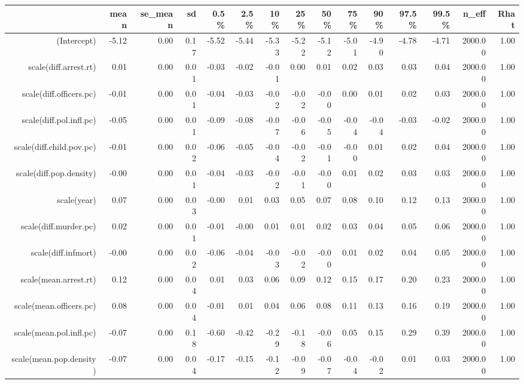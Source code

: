 \begin{table}[ht]
\centering
\begin{tabular}{rrrrrrrrrrrrrrr}
  \hline
 & mean & se\_mean & sd & 0.5\% & 2.5\% & 10\% & 25\% & 50\% & 75\% & 90\% & 97.5\% & 99.5\% & n\_eff & Rhat \\ 
  \hline
(Intercept) & -5.12 & 0.00 & 0.17 & -5.52 & -5.44 & -5.33 & -5.22 & -5.12 & -5.01 & -4.90 & -4.78 & -4.71 & 2000.00 & 1.00 \\ 
  scale(diff.arrest.rt) & 0.01 & 0.00 & 0.01 & -0.03 & -0.02 & -0.01 & 0.00 & 0.01 & 0.02 & 0.03 & 0.03 & 0.04 & 2000.00 & 1.00 \\ 
  scale(diff.officers.pc) & -0.01 & 0.00 & 0.01 & -0.04 & -0.03 & -0.02 & -0.02 & -0.00 & 0.00 & 0.01 & 0.02 & 0.03 & 2000.00 & 1.00 \\ 
  scale(diff.pol.infl.pc) & -0.05 & 0.00 & 0.01 & -0.09 & -0.08 & -0.07 & -0.06 & -0.05 & -0.04 & -0.04 & -0.03 & -0.02 & 2000.00 & 1.00 \\ 
  scale(diff.child.pov.pc) & -0.01 & 0.00 & 0.02 & -0.06 & -0.05 & -0.04 & -0.02 & -0.01 & -0.00 & 0.01 & 0.02 & 0.04 & 2000.00 & 1.00 \\ 
  scale(diff.pop.density) & -0.00 & 0.00 & 0.01 & -0.04 & -0.03 & -0.02 & -0.01 & -0.00 & 0.01 & 0.02 & 0.03 & 0.03 & 2000.00 & 1.00 \\ 
  scale(year) & 0.07 & 0.00 & 0.03 & -0.00 & 0.01 & 0.03 & 0.05 & 0.07 & 0.08 & 0.10 & 0.12 & 0.13 & 2000.00 & 1.00 \\ 
  scale(diff.murder.pc) & 0.02 & 0.00 & 0.01 & -0.01 & -0.00 & 0.01 & 0.01 & 0.02 & 0.03 & 0.04 & 0.05 & 0.06 & 2000.00 & 1.00 \\ 
  scale(diff.infmort) & -0.00 & 0.00 & 0.02 & -0.06 & -0.04 & -0.03 & -0.02 & -0.00 & 0.01 & 0.02 & 0.04 & 0.05 & 2000.00 & 1.00 \\ 
  scale(mean.arrest.rt) & 0.12 & 0.00 & 0.04 & 0.01 & 0.03 & 0.06 & 0.09 & 0.12 & 0.15 & 0.17 & 0.20 & 0.23 & 2000.00 & 1.00 \\ 
  scale(mean.officers.pc) & 0.08 & 0.00 & 0.04 & -0.01 & 0.01 & 0.04 & 0.06 & 0.08 & 0.11 & 0.13 & 0.16 & 0.19 & 2000.00 & 1.00 \\ 
  scale(mean.pol.infl.pc) & -0.07 & 0.00 & 0.18 & -0.60 & -0.42 & -0.29 & -0.18 & -0.06 & 0.05 & 0.15 & 0.29 & 0.39 & 2000.00 & 1.00 \\ 
  scale(mean.pop.density) & -0.07 & 0.00 & 0.04 & -0.17 & -0.15 & -0.12 & -0.09 & -0.07 & -0.04 & -0.02 & 0.01 & 0.03 & 2000.00 & 1.00 \\ 

\end{tabular}
\end{table}
